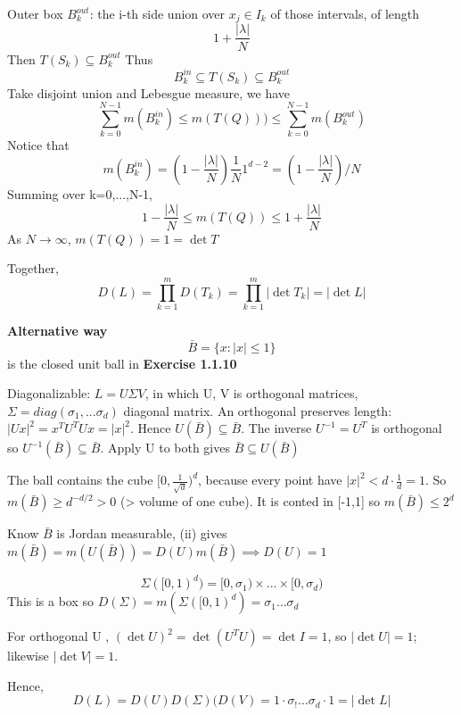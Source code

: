 Outer box $B_k^{out}$: the i-th side union over $x_j \in I_k$ of those intervals, of length
\[
1 + \frac{|\lambda|}{N}
\]
Then $T(S_k) \subseteq B_k^{out}$
Thus
\[
B_k^{in} \subseteq T(S_k) \subseteq B_k^{out}
\]
Take disjoint union and Lebesgue measure, we have
\[
\sum_{k=0}^{N-1} m(B_k^{in}) \le m(T(Q))) \le \sum_{k=0}^{N-1} m(B_k^{out})
\]
Notice that
\[
m(B_k^{in})= \left( 1 -\frac{|\lambda|}{N} \right) \frac{1}{N} 1^{d-2} = \left(1- \frac{|\lambda|}{N} \right) / N
\]
Summing over k=0,...,N-1, 
\[
1 - \frac{|\lambda|}{N} \le m(T(Q)) \le 1 + \frac{|\lambda|}{N}
\]
As $N \rightarrow \infty$, $m(T(Q)) = 1 = \det T$


 Together,
 \[
 D(L) = \prod_{k=1}^m D(T_k) = \prod_{k=1}^m |\det T_k| = | \det L|
 \]

 \textbf{Alternative way}
 \[
 \bar{B} = \{x: |x| \le 1\}
 \]
 is the closed unit ball in \textbf{Exercise 1.1.10}

Diagonalizable: $L = U \Sigma V$, in which U, V is orthogonal matrices, $\Sigma =  diag (\sigma_1,...\sigma_d)$ diagonal matrix.
An orthogonal preserves length: $|Ux|^2 = x^T U^T U x = |x|^2$. Hence $U(\bar B ) \subseteq \bar B$. The inverse $U^{-1} = U^T$ is orthogonal so $U^{-1} (\bar B) \subseteq \bar B$. Apply U to both gives $\bar B \subseteq U(\bar B)$

The ball contains the cube $[0, \frac{1}{\sqrt{d}})^d$, because every point have $|x|^2 < d \cdot \frac{1}{d} = 1$. So $m( \bar B) \ge d ^{-d/2} > 0 $ (> volume of one cube). It is conted in [-1,1] so $m(\bar B) \le 2^d$

Know $\bar B$ is Jordan measurable, (ii) gives $m(\bar B) = m ( U(\bar B )) = D(U) m(\bar B) \implies D(U) =1$

\[
\Sigma([0,1)^d) = [0, \sigma_1) \times ... \times [0, \sigma_d)
\]
This is a box so $D(\Sigma) = m(\Sigma([0,1)^d) = \sigma_1 \dots \sigma_d$


For orthogonal U , $(\det U )^2 = \det (U ^T U ) = \det I = 1$, so $|\det U| = 1$; likewise $|\det V | = 1$.

Hence,
\[
D(L) = D(U) D(\Sigma)(D(V) = 1 \cdot \sigma_! \dots \sigma_d \cdot  1 = |\det L|
\]